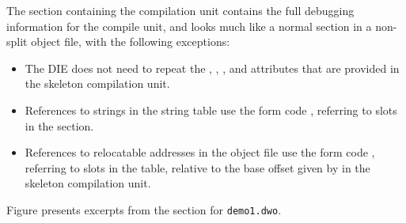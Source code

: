 The \dotdebuginfodwo{} section containing the compilation unit
contains the full debugging information for the compile unit, and
looks much like a normal \dotdebuginfo{} section in a non-split
object file, with the following exceptions:
\begin{itemize}
\item The \DWTAGcompileunit{} DIE does not need to repeat the
\DWATranges, \DWATlowpc, \DWAThighpc, and
\DWATstmtlist{} attributes that are provided in the skeleton
compilation unit.

\item References to strings in the string table use the 
form code \DWFORMstrx, referring to slots in the
\dotdebugstroffsetsdwo{} section.

\bbpareb

\item References to relocatable addresses in the object file 
use the form code \DWFORMaddrx, referring to slots in the
\dotdebugaddr{} table, relative to the base offset given by
\DWATaddrbase{} in the skeleton compilation unit.
\end{itemize}

\vspace*{1mm}
Figure  presents
excerpts from the \dotdebuginfodwo{} section for \texttt{demo1.dwo}.

